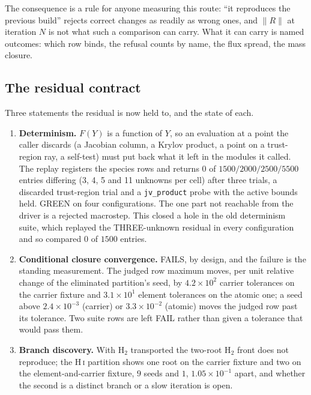 \documentclass[english,a4paper]{my_memo}
\newcommand{\code}[1]{\texttt{#1}}
\begin{document}
The consequence is a rule for anyone measuring this route: ``it reproduces
the previous build'' rejects correct changes as readily as wrong ones, and
$\|R\|$ at iteration $N$ is not what such a comparison can carry. What it can
carry is named outcomes: which row binds, the refusal counts by name, the
flux spread, the mass closure.

\subsection{The residual contract}
\label{sec:rescontract}

Three statements the residual is now held to, and the state of each.

\begin{enumerate}
\item \textbf{Determinism.} $F(Y)$ is a function of $Y$, so an evaluation at
  a point the caller discards (a Jacobian column, a Krylov product, a point
  on a trust-region ray, a self-test) must put back what it left in the
  modules it called. The replay registers the species rows and returns
  $0$ of $1500 / 2000 / 2500 / 5500$ entries differing (3, 4, 5 and 11
  unknowns per cell) after three trials, a discarded trust-region trial and
  a \code{jv\_product} probe with the active bounds held. GREEN on four
  configurations. The one part not reachable from the driver is a rejected
  macrostep. This closed a hole in the old determinism suite, which replayed
  the THREE-unknown residual in every configuration and so compared $0$ of
  $1500$ entries.
\item \textbf{Conditional closure convergence.} FAILS, by design, and the
  failure is the standing measurement. The judged row maximum moves, per
  unit relative change of the eliminated partition's seed, by $4.2\times10^{2}$
  carrier tolerances on the carrier fixture and $3.1\times10^{1}$ element
  tolerances on the atomic one; a seed above $2.4\times10^{-3}$ (carrier) or
  $3.3\times10^{-2}$ (atomic) moves the judged row past its tolerance. Two
  suite rows are left FAIL rather than given a tolerance that would pass
  them.
\item \textbf{Branch discovery.} With H$_2$ transported the two-root H$_2$
  front does not reproduce; the H\,\textsc{i} partition shows one root on the
  carrier fixture and two on the element-and-carrier fixture, $9$ seeds and
  $1$, $1.05\times10^{-1}$ apart, and whether the second is a distinct branch
  or a slow iteration is open.
\end{enumerate}
\end{document}
